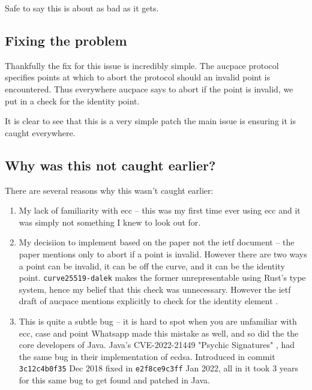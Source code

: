 Safe to say this is about as bad as it gets.

\subsection{Fixing the problem}
Thankfully the fix for this issue is incredibly simple.
The \gls{aucpace} protocol specifies points at which to abort the protocol should an invalid point is encountered.
Thus everywhere \gls{aucpace} says to abort if the point is invalid, we put in a check for the identity point.


It is clear to see that this is a very simple patch the main issue is ensuring it is caught everywhere.

\subsection{Why was this not caught earlier?}
There are several reasons why this wasn't caught earlier:
\begin{enumerate}
  \item{My lack of familiarity with \gls{ecc} -- this was my first time ever using \gls{ecc} and it was simply not something I knew to look out for.}
  \item{My decisiion to implement based on the paper not the \gls{ietf} document -- the paper mentions only to abort if a point is invalid. However there are two ways a point can be invalid, it can be off the curve, and it can be the identity point. \texttt{curve25519-dalek} makes the former unrepresentable using Rust's type system, hence my belief that this check was unnecessary. However the \gls{ietf} draft of \gls{aucpace} mentions explicitly to check for the identity element \cite{ietf-aucpace}.}
  \item{This is quite a subtle bug -- it is hard to spot when you are unfamiliar with \gls{ecc}, case and point Whatsapp made this mistake as well, and so did the the core developers of Java. Java's CVE-2022-21449 "Psychic Signatures" \cite{java-psychic-signatures}, had the same bug in their implementation of \gls{ecdsa}. Introduced in commit \texttt{3c12c4b0f35} Dec 2018 fixed in \texttt{e2f8ce9c3ff} Jan 2022, all in it took 3 years for this same bug to get found and patched in Java.}
\end{enumerate}

